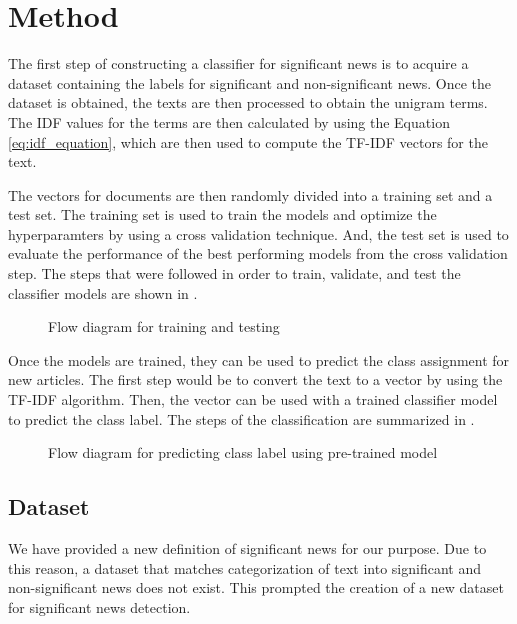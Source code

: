 \chapter{Method} \label{method}
The first step of constructing a classifier for significant news is to acquire a dataset containing the labels for significant and non-significant news. Once the dataset is obtained, the texts are then processed to obtain the unigram terms. The IDF values for the terms are then calculated by using the Equation \eqref{eq:idf_equation}, which are then used to compute the TF-IDF vectors for the text.

The vectors for documents are then randomly divided into a training set and a test set. The training set is used to train the models and optimize the hyperparamters by using a cross validation technique. And, the test set is used to evaluate the performance of the best performing models from the cross validation step. The steps that were followed in order to train, validate, and test the classifier models are shown in .

\begin{figure}[h]
    \caption{Flow diagram for training and testing}
    \label{fig:training}
\end{figure}

Once the models are trained, they can be used to predict the class assignment for new articles. The first step would be to convert the text to a vector by using the TF-IDF algorithm. Then, the vector can be used with a trained classifier model to predict the class label. The steps of the classification are summarized in .

\begin{figure}[h]
    \caption{Flow diagram for predicting class label using pre-trained model}
    \label{fig:prediction}
\end{figure}

\section{Dataset}
We have provided a new definition of significant news for our purpose. Due to this reason, a dataset that matches categorization of text into significant and non-significant news does not exist. This prompted the creation of a new dataset for significant news detection. 

